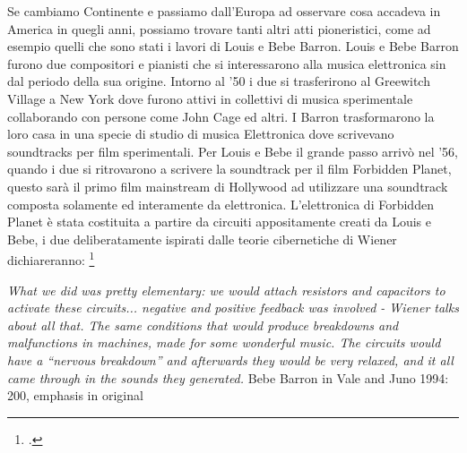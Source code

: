 Se cambiamo Continente e passiamo dall'Europa ad osservare cosa accadeva
in America in quegli anni, possiamo trovare tanti altri atti pioneristici,
come ad esempio quelli che sono stati i lavori di Louis e Bebe Barron.
Louis e Bebe Barron furono due compositori e pianisti che si
interessarono alla musica elettronica sin dal periodo della sua origine.
Intorno al '50 i due si trasferirono al Greewitch Village a New York
dove furono attivi in collettivi di musica sperimentale
collaborando con persone come John Cage ed altri.
I Barron trasformarono
la loro casa in una specie di studio di musica Elettronica
dove scrivevano soundtracks per film sperimentali.
Per Louis e Bebe il grande passo arrivò nel
'56, quando i due si ritrovarono a scrivere la soundtrack per il film
Forbidden Planet,
questo sarà il primo film mainstream di Hollywood ad utilizzare una soundtrack
composta solamente ed interamente da elettronica.
L'elettronica di Forbidden Planet è stata
costituita a partire da circuiti appositamente creati da Louis e Bebe,
i due deliberatamente ispirati dalle teorie cibernetiche di Wiener
dichiareranno: \footcite{dunbarlisteningcyb}

\begin{center}
\vspace{0.5cm}
\textit{What we did was pretty elementary: we would attach resistors and capacitors
to activate these
circuits... negative and positive feedback was involved - Wiener
talks about all that. The same
conditions that would produce breakdowns and malfunctions in machines,
made for some
wonderful music. The circuits would have a “nervous breakdown”
and afterwards they would be
very relaxed, and it all came through in the sounds they generated.}
\vspace{0.5cm}
Bebe Barron in Vale and Juno 1994: 200, emphasis in original
\vspace{0.5cm}
\end{center}

